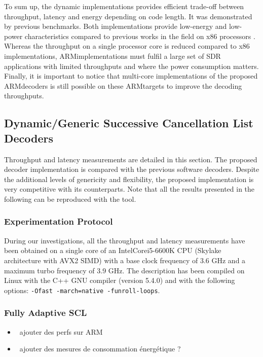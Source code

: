 To sum up, the dynamic implementations provides efficient trade-off between
throughput, latency and energy depending on code length. It was demonstrated by
previous benchmarks. Both implementations provide low-energy and low-power
characteristics compared to previous works in the field on x86 processors
\cite{Sarkis2014,Giard2014,Sarkis2014a,LeGal2014,LeGal2015a,Cassagne2015c}.
Whereas the throughput on a single processor core is reduced compared to x86
implementations, ARM\R implementations must fulfil a large set of SDR
applications with limited throughputs and where the power consumption matters.
Finally, it is important to notice that multi-core implementations of the
proposed ARM\R decoders is still possible on these ARM\R targets to improve the
decoding throughputs.

\subsection{Dynamic/Generic Successive Cancellation List Decoders}

Throughput and latency measurements are detailed in this section. The proposed
decoder implementation is compared with the previous software decoders. Despite
the additional levels of genericity and flexibility, the proposed implementation
is very competitive with its counterparts. Note that all the results presented
in the following can be reproduced with the \AFFECT tool.

\subsubsection{Experimentation Protocol}

During our investigations, all the throughput and latency measurements have been
obtained on a single core of an Intel\R Core\TM i5-6600K CPU (Skylake
architecture with AVX2 SIMD) with a base clock frequency of 3.6 GHz and a
maximum turbo frequency of 3.9 GHz. The description has been compiled on Linux
with the C++ GNU compiler (version 5.4.0) and with the following options:
\verb|-Ofast -march=native -funroll-loops|.

\subsubsection{Fully Adaptive SCL}

\begin{itemize}
  \item \xmark~ajouter des perfs sur ARM
  \item \xmark~ajouter des mesures de consommation énergétique ?
\end{itemize}

